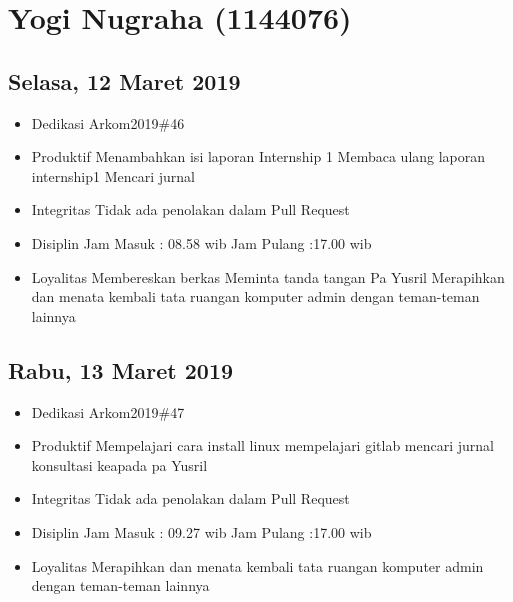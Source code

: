 \chapter{Yogi Nugraha (1144076)}

\section{Selasa, 12 Maret 2019}
\begin{itemize}
\item Dedikasi
\subitem Arkom2019\#46
\item Produktif
  \subitem Menambahkan isi laporan Internship 1
  \subitem Membaca ulang laporan internship1
  \subitem Mencari jurnal
\item Integritas
  \subitem Tidak ada penolakan dalam Pull Request
\item Disiplin
  \subitem Jam Masuk : 08.58 wib
  \subitem Jam Pulang :17.00 wib
\item Loyalitas
  \subitem Membereskan berkas  
  \subitem Meminta tanda tangan Pa Yusril
  \subitem Merapihkan dan menata kembali tata ruangan komputer admin dengan teman-teman lainnya
\end{itemize}


\section{Rabu, 13 Maret 2019}
\begin{itemize}
\item Dedikasi
\subitem Arkom2019\#47
\item Produktif
  \subitem Mempelajari cara install linux
  \subitem mempelajari gitlab 
  \subitem mencari jurnal
  \subitem konsultasi keapada pa Yusril
\item Integritas
  \subitem Tidak ada penolakan dalam Pull Request
\item Disiplin
  \subitem Jam Masuk : 09.27 wib
  \subitem Jam Pulang :17.00 wib
\item Loyalitas
  \subitem Merapihkan dan menata kembali tata ruangan komputer admin dengan teman-teman lainnya
\end{itemize}

